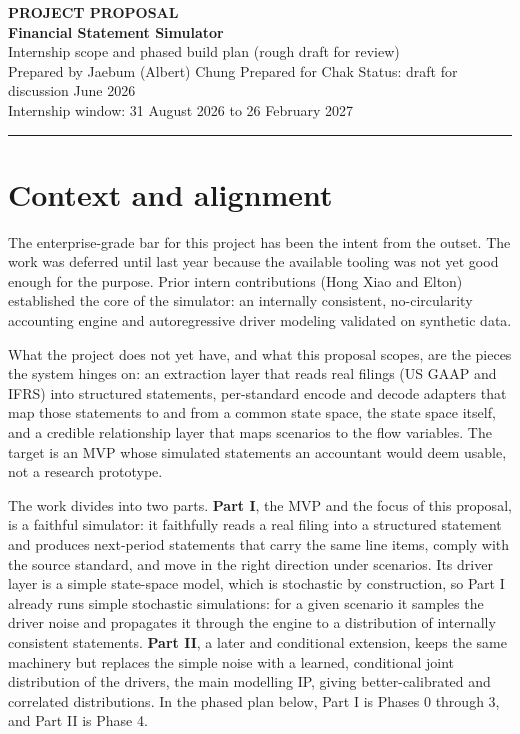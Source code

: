 \documentclass[11pt]{article}
\begin{document}
\color{bodytext}

\begin{flushleft}
{\color{gold}\bfseries PROJECT PROPOSAL}\\[3pt]
{\color{navy}\bfseries\fontsize{26}{30}\selectfont Financial Statement Simulator}\\[4pt]
{\color{slate}\large Internship scope and phased build plan (rough draft for review)}\\[6pt]
{\color{slate}\small Prepared by Jaebum (Albert) Chung \quad\textbar\quad Prepared for Chak \quad\textbar\quad Status: draft for discussion \quad\textbar\quad June 2026}\\[3pt]
{\color{slate}\small Internship window: 31 August 2026 to 26 February 2027}
\end{flushleft}
\vspace{4pt}
{\color{gold}\rule{\linewidth}{2pt}}
\vspace{6pt}

\section{Context and alignment}
The enterprise-grade bar for this project has been the intent from the outset. The work was deferred until last year because the available tooling was not yet good enough for the purpose. Prior intern contributions (Hong Xiao and Elton) established the core of the simulator: an internally consistent, no-circularity accounting engine and autoregressive driver modeling validated on synthetic data.

What the project does not yet have, and what this proposal scopes, are the pieces the system hinges on: an extraction layer that reads real filings (US GAAP and IFRS) into structured statements, per-standard encode and decode adapters that map those statements to and from a common state space, the state space itself, and a credible relationship layer that maps scenarios to the flow variables. The target is an MVP whose simulated statements an accountant would deem usable, not a research prototype.

The work divides into two parts. \textbf{Part I}, the MVP and the focus of this proposal, is a faithful simulator: it faithfully reads a real filing into a structured statement and produces next-period statements that carry the same line items, comply with the source standard, and move in the right direction under scenarios. Its driver layer is a simple state-space model, which is stochastic by construction, so Part I already runs simple stochastic simulations: for a given scenario it samples the driver noise and propagates it through the engine to a distribution of internally consistent statements. \textbf{Part II}, a later and conditional extension, keeps the same machinery but replaces the simple noise with a learned, conditional joint distribution of the drivers, the main modelling IP, giving better-calibrated and correlated distributions. In the phased plan below, Part I is Phases 0 through 3, and Part II is Phase 4.
\end{document}
